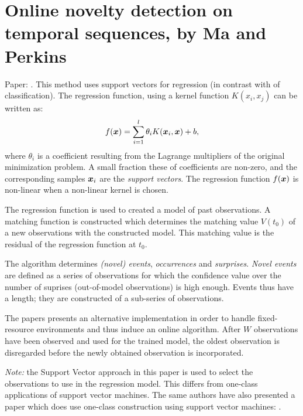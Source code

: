 \clearpage
\section{Online novelty detection on temporal sequences, by Ma and Perkins}
Paper: \cite{ma2003online}.
This method uses support vectors for regression (in contrast with of classification).
The regression function, using a kernel function $K(x_i, x_j)$ can be written as:
%
\begin{equation}
  f(\vectorsym{x}) = \sum_{i=1}^l \theta_i K(\vectorsym{x}_i, \vectorsym{x}) + b,
\end{equation}
%
where $\theta_i$ is a coefficient resulting from the Lagrange multipliers of the original minimization problem.
A small fraction these of coefficients are non-zero, and the corresponding samples $\vectorsym{x}_i$ are the \emph{support vectors}.
The regression function $f(\vectorsym{x})$ is non-linear when a non-linear kernel is chosen.

The regression function is used to created a model of past observations.
A matching function is constructed which determines the matching value $V(t_0)$ of a new observations with the constructed model.
This matching value is the residual of the regression function at $t_0$.

The algorithm determines \emph{(novel) events}, \emph{occurrences} and \emph{surprises}.
\emph{Novel events} are defined as a series of observations for which the confidence value over the number of suprises (out-of-model observations) is high enough.
Events thus have a length; they are constructed of a sub-series of observations.

The papers presents an alternative implementation in order to handle fixed-resource environments and thus induce an online algorithm.
After $W$ observations have been observed and used for the trained model, the oldest observation is disregarded before the newly obtained observation is incorporated.

\emph{Note:} the Support Vector approach in this paper is used to select the observations to use in the regression model.
This differs from one-class applications of support vector machines.
The same authors have also presented a paper which does use one-class construction using support vector machines: \cite{ma2003time}.



\clearpage
